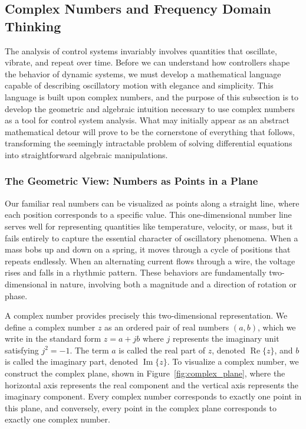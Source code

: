 \subsection{Complex Numbers and Frequency Domain Thinking}

The analysis of control systems invariably involves quantities that oscillate, vibrate, and repeat over time. Before we can understand how controllers shape the behavior of dynamic systems, we must develop a mathematical language capable of describing oscillatory motion with elegance and simplicity. This language is built upon complex numbers, and the purpose of this subsection is to develop the geometric and algebraic intuition necessary to use complex numbers as a tool for control system analysis. What may initially appear as an abstract mathematical detour will prove to be the cornerstone of everything that follows, transforming the seemingly intractable problem of solving differential equations into straightforward algebraic manipulations.

\subsubsection{The Geometric View: Numbers as Points in a Plane}

Our familiar real numbers can be visualized as points along a straight line, where each position corresponds to a specific value. This one-dimensional number line serves well for representing quantities like temperature, velocity, or mass, but it fails entirely to capture the essential character of oscillatory phenomena. When a mass bobs up and down on a spring, it moves through a cycle of positions that repeats endlessly. When an alternating current flows through a wire, the voltage rises and falls in a rhythmic pattern. These behaviors are fundamentally two-dimensional in nature, involving both a magnitude and a direction of rotation or phase.

A complex number provides precisely this two-dimensional representation. We define a complex number $z$ as an ordered pair of real numbers $(a, b)$, which we write in the standard form $z = a + jb$ where $j$ represents the imaginary unit satisfying $j^2 = -1$. The term $a$ is called the real part of $z$, denoted $\operatorname{Re}\{z\}$, and $b$ is called the imaginary part, denoted $\operatorname{Im}\{z\}$. To visualize a complex number, we construct the complex plane, shown in Figure~\ref{fig:complex_plane}, where the horizontal axis represents the real component and the vertical axis represents the imaginary component. Every complex number corresponds to exactly one point in this plane, and conversely, every point in the complex plane corresponds to exactly one complex number.

